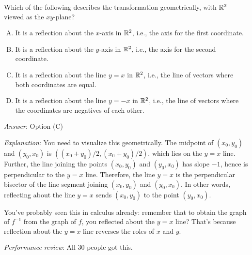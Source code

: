 \documentclass[10pt]{amsart}
\begin{document}
\begin{enumerate}
  Which of the following describes the transformation geometrically,
  with $\mathbb{R}^2$ viewed as the $xy$-plane?
  \begin{enumerate}[(A)]
  \item It is a reflection about the $x$-axis in $\mathbb{R}^2$, i.e., the
    axis for the first coordinate.
  \item It is a reflection about the $y$-axis in $\mathbb{R}^2$, i.e., the
    axis for the second coordinate.
  \item It is a reflection about the line $y = x$ in $\mathbb{R}^2$, i.e., the
    line of vectors where both coordinates are equal.
  \item It is a reflection about the line $y = -x$ in $\mathbb{R}^2$, i.e.,
    the line of vectors where the coordinates are negatives of each
    other.
  \end{enumerate}

  {\em Answer}: Option (C)

  {\em Explanation}: You need to visualize this geometrically. The
  midpoint of $(x_0,y_0)$ and $(y_0,x_0)$ is
  $((x_0+y_0)/2,(x_0+y_0)/2)$, which lies on the $y = x$
  line. Further, the line joining the points $(x_0,y_0)$ and
  $(y_0,x_0)$ has slope $-1$, hence is perpendicular to the $y = x$
  line. Therefore, the line $y = x$ is the perpendicular bisector of
  the line segment joining $(x_0,y_0)$ and $(y_0,x_0)$. In other
  words, reflecting about the line $y = x$ sends $(x_0,y_0)$ to the
  point $(y_0,x_0)$.

  You've probably seen this in calculus already: remember that to
  obtain the graph of $f^{-1}$ from the graph of $f$, you reflected
  about the $y = x$ line? That's because reflection about the $y = x$
  line reverses the roles of $x$ and $y$.

  {\em Performance review}: All 30 people got this.
\end{enumerate}
\end{document}
